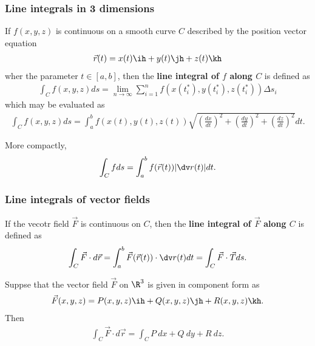 \documentclass{article}
\begin{document}
\subsubsection{Line integrals in 3 dimensions}

\begin{definition}
	If $f(x,y,z)$ is continuous on a smooth curve $C$ described by the
	position vector equation
	\begin{align*}
		\vec r(t) = x(t)\ih + y(t)\jh + z(t)\kh
	\end{align*}
	wher the parameter $t\in[a,b]$, then the \textbf{line integral of $f$ along $C$}
	is defined as
	\begin{align*}
		\int_C f(x,y,z)ds = \lim_{n\to\infty}\sum_{i=1}^n f(x(t_i^*), y(t_i^*), z(t_i^*))\Delta s_i
	\end{align*}
	which may be evaluated as
	\begin{align*}
		\int_C f(x,y,z)ds = \int_a^b f(x(t), y(t), z(t))\sqrt{\left(\frac{dx}{dt}\right)^2 + \left(\frac{dy}{dt}\right)^2 + \left(\frac{dz}{dt}\right)^2}dt.
	\end{align*}
\end{definition}
\begin{lemma}
	More compactly,
	\begin{align*}
		\int_C f ds = \int_a^b f(\vec r(t))|\dv r(t)|dt.
	\end{align*}
\end{lemma}

\subsubsection{Line integrals of vector fields}

\begin{definition}
	If the vecotr field $\vec F$ is continuous on $C$, then the
	\textbf{line integral of $\vec F$ along $C$} is defined as
	\begin{align*}
		\int_C \vec F\cdot d\vec r = \int_a^b \vec F(\vec r(t))\cdot \dv r(t)dt
		= \int_C \vec F\cdot \vec T ds.
	\end{align*}
\end{definition}
\begin{theorem}
	Suppse that the vector field $\vec F$ on $\R^3$ is given in component
	form as
	\begin{align*}
		\vec F(x,y,z) = P(x,y,z)\ih + Q(x,y,z)\jh + R(x,y,z)\kh.
	\end{align*}
	Then
	\begin{align*}
		\int_C \vec F\cdot d\vec r = \int_C P\:dx + Q\:dy + R\:dz.
	\end{align*}
\end{theorem}
\end{document}
